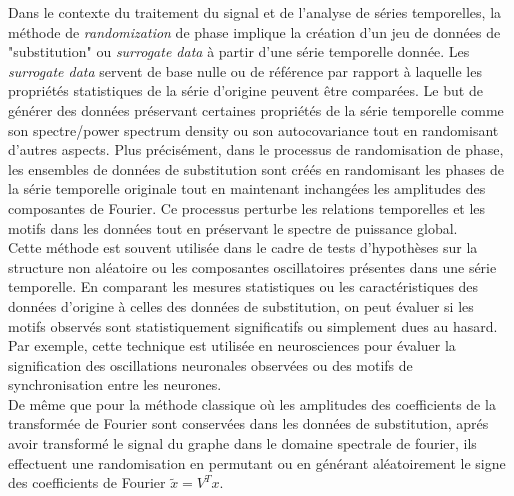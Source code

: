\documentclass[12pt]{article}
\begin{document}
    Dans le contexte du traitement du signal et de l'analyse de séries temporelles, la méthode de \textit{randomization} de phase implique la création d'un jeu de données de "substitution" ou \textit{surrogate data} à partir d'une série temporelle donnée. Les \textit{surrogate data} servent de base nulle ou de référence par rapport à laquelle les propriétés statistiques de la série d'origine peuvent être comparées. Le but de générer des données préservant certaines propriétés de la série temporelle comme son spectre/power spectrum density ou son autocovariance
    tout en randomisant d'autres aspects. Plus précisément, dans le processus de randomisation de phase, les ensembles de données de substitution sont créés en randomisant les phases de la série temporelle originale tout en maintenant inchangées les amplitudes des composantes de Fourier. Ce processus perturbe les relations temporelles et les motifs dans les données tout en préservant le spectre de puissance global.\\
    Cette méthode est souvent utilisée dans le cadre de tests d'hypothèses sur la structure non aléatoire ou les composantes oscillatoires présentes dans une série temporelle. En comparant les mesures statistiques ou les caractéristiques des données d'origine à celles des données de substitution, on peut évaluer si les motifs observés sont statistiquement significatifs ou simplement dues au hasard. Par exemple, cette technique est utilisée en neurosciences pour 
    évaluer la signification des oscillations neuronales observées ou des motifs de synchronisation entre les neurones.\\

    De même que pour la méthode classique où les amplitudes des coefficients de la transformée de Fourier sont conservées dans les données de substitution, aprés avoir transformé le signal du graphe dans le domaine spectrale de fourier, ils effectuent une randomisation en permutant ou en générant aléatoirement le signe des coefficients de Fourier $\tilde{x} = V^Tx$.
\end{document}

